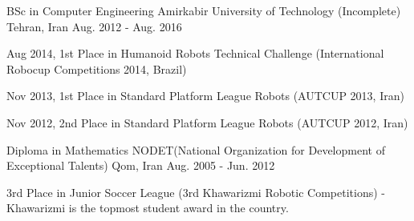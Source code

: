 

\begin{cventries}

  \cventry
    {BSc in Computer Engineering} %
    {Amirkabir University of Technology} %
    {(Incomplete)}
    {Tehran, Iran} %
    {Aug. 2012 - Aug. 2016} %
    {
      \begin{cvitems} %
      \item {Aug 2014, 1st Place in Humanoid Robots Technical Challenge (International Robocup Competitions 2014, Brazil)}
      \item {Nov 2013, 1st Place in Standard Platform League Robots (AUTCUP 2013, Iran)}
      \item {Nov 2012, 2nd Place in Standard Platform League Robots (AUTCUP 2012, Iran)}
      \end{cvitems}
    }
  \cventry
    {Diploma in Mathematics} %
    {NODET(National Organization for Development of Exceptional Talents)} %
    {Qom, Iran} %
    {Aug. 2005 - Jun. 2012} %
    {
      \begin{cvitems} %
      \item {3rd Place in Junior Soccer League (3rd Khawarizmi Robotic Competitions) - Khawarizmi is the topmost student award in the country.}
      \end{cvitems}
    }

\end{cventries}
